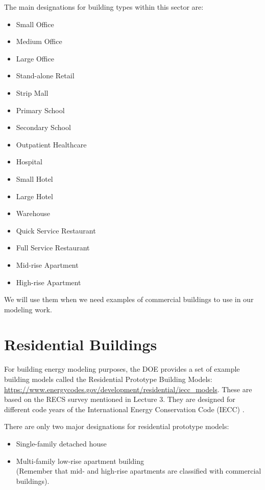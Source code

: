 \documentclass[10pt]{article}
\begin{document}
The main designations for building types within this sector are:
\begin{itemize}
    \setlength{\itemsep}{0pt}%
    \setlength{\parskip}{0pt}%
    \item Small Office
    \item Medium Office
    \item Large Office
    \item Stand-alone Retail
    \item Strip Mall
    \item Primary School
    \item Secondary School
    \item Outpatient Healthcare
    \item Hospital
    \item Small Hotel
    \item Large Hotel
    \item Warehouse
    \item Quick Service Restaurant
    \item Full Service Restaurant
    \item Mid-rise Apartment
    \item High-rise Apartment
\end{itemize}

We will use them when we need examples of commercial buildings to use in our modeling work.

\section{Residential Buildings}

For building energy modeling purposes, the DOE provides a set of example building models called the Residential Prototype Building Models:  \url{https://www.energycodes.gov/development/residential/iecc_models}. These are based on the RECS survey mentioned in Lecture 3. They are designed for different code years of the International Energy Conservation Code (IECC) {\color{blue}\cite{IECCresources}}.

There are only two major designations for residential prototype models:
\begin{itemize}
    \setlength{\itemsep}{0pt}%
    \setlength{\parskip}{0pt}%
    \item Single-family detached house
    \item Multi-family low-rise apartment building\\(Remember that mid- and high-rise apartments are classified with commercial buildings).
\end{itemize}
\end{document}

